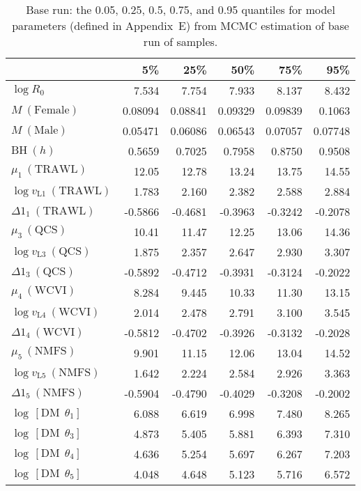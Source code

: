 \documentclass[11pt]{book}
\newcommand{\AppEqn}{Appendix~E}
\begin{document}
\setlength{\tabcolsep}{6pt}
\begin{table}[ht]
\centering
\caption{Base run: the 0.05, 0.25, 0.5, 0.75, and 0.95 quantiles for  model parameters (defined in \AppEqn) from MCMC estimation of  base run of \Nbase{} samples.} 
\label{tab:car.base.pars}
\begin{tabular}{lrrrrr}
  \\[-1.0ex] \hline
 & 5\% & 25\% & 50\% & 75\% & 95\% \\ 
  \hline
$\log R_{0}$ & 7.534 & 7.754 & 7.933 & 8.137 & 8.432 \\ 
  $M~(\text{Female})$ & 0.08094 & 0.08841 & 0.09329 & 0.09839 & 0.1063 \\ 
  $M~(\text{Male})$ & 0.05471 & 0.06086 & 0.06543 & 0.07057 & 0.07748 \\ 
  $\text{BH}~(h)$ & 0.5659 & 0.7025 & 0.7958 & 0.8750 & 0.9508 \\ 
  $\mu_{1}~(\text{TRAWL})$ & 12.05 & 12.78 & 13.24 & 13.75 & 14.55 \\ 
  $\log v_{\text{L}1}~(\text{TRAWL})$ & 1.783 & 2.160 & 2.382 & 2.588 & 2.884 \\ 
  $\Delta1_{1}~(\text{TRAWL})$ & -0.5866 & -0.4681 & -0.3963 & -0.3242 & -0.2078 \\ 
  $\mu_{3}~(\text{QCS})$ & 10.41 & 11.47 & 12.25 & 13.06 & 14.36 \\ 
  $\log v_{\text{L}3}~(\text{QCS})$ & 1.875 & 2.357 & 2.647 & 2.930 & 3.307 \\ 
  $\Delta1_{3}~(\text{QCS})$ & -0.5892 & -0.4712 & -0.3931 & -0.3124 & -0.2022 \\ 
  $\mu_{4}~(\text{WCVI})$ & 8.284 & 9.445 & 10.33 & 11.30 & 13.15 \\ 
  $\log v_{\text{L}4}~(\text{WCVI})$ & 2.014 & 2.478 & 2.791 & 3.100 & 3.545 \\ 
  $\Delta1_{4}~(\text{WCVI})$ & -0.5812 & -0.4702 & -0.3926 & -0.3132 & -0.2028 \\ 
  $\mu_{5}~(\text{NMFS})$ & 9.901 & 11.15 & 12.06 & 13.04 & 14.52 \\ 
  $\log v_{\text{L}5}~(\text{NMFS})$ & 1.642 & 2.224 & 2.584 & 2.926 & 3.363 \\ 
  $\Delta1_{5}~(\text{NMFS})$ & -0.5904 & -0.4790 & -0.4029 & -0.3208 & -0.2002 \\ 
  $\log\,[\text{DM}~~\theta_1]$ & 6.088 & 6.619 & 6.998 & 7.480 & 8.265 \\ 
  $\log\,[\text{DM}~~\theta_3]$ & 4.873 & 5.405 & 5.881 & 6.393 & 7.310 \\ 
  $\log\,[\text{DM}~~\theta_4]$ & 4.636 & 5.254 & 5.697 & 6.267 & 7.203 \\ 
  $\log\,[\text{DM}~~\theta_5]$ & 4.048 & 4.648 & 5.123 & 5.716 & 6.572 \\ 
   \hline
\end{tabular}
\end{table}
\end{document}
